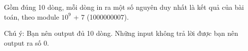Gồm đúng 10 dòng, mỗi dòng in ra một số nguyên duy nhất là kết quả của bài toán, theo module $10^{9}$ + 7 (1000000007).

Chú ý: Bạn nên output đủ 10 dòng. Những input không trả lời được bạn nên output ra số 0.
\begin{itemize}
\end{itemize}